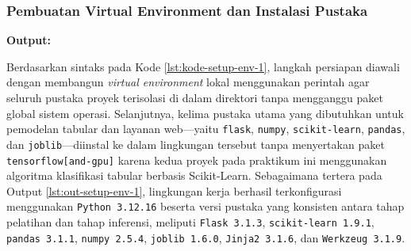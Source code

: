 \documentclass[a4paper,oneside,11pt]{book}
\begin{document}
\subsubsection{Pembuatan Virtual Environment dan Instalasi Pustaka}

\par \textbf{Output:}

\par Berdasarkan sintaks pada Kode \ref{lst:kode-setup-env-1}, langkah persiapan diawali dengan membangun \textit{virtual environment} lokal menggunakan perintah  agar seluruh pustaka proyek terisolasi di dalam direktori  tanpa mengganggu paket global sistem operasi. Selanjutnya, kelima pustaka utama yang dibutuhkan untuk pemodelan tabular dan layanan web---yaitu \texttt{flask}, \texttt{numpy}, \texttt{scikit-learn}, \texttt{pandas}, dan \texttt{joblib}---diinstal ke dalam lingkungan tersebut tanpa menyertakan paket \texttt{tensorflow[and-gpu]} karena kedua proyek pada praktikum ini menggunakan algoritma klasifikasi tabular berbasis Scikit-Learn. Sebagaimana tertera pada Output \ref{lst:out-setup-env-1}, lingkungan kerja berhasil terkonfigurasi menggunakan \texttt{Python 3.12.16} beserta versi pustaka yang konsisten antara tahap pelatihan dan tahap inferensi, meliputi \texttt{Flask 3.1.3}, \texttt{scikit-learn 1.9.1}, \texttt{pandas 3.1.1}, \texttt{numpy 2.5.4}, \texttt{joblib 1.6.0}, \texttt{Jinja2 3.1.6}, dan \texttt{Werkzeug 3.1.9}.
\end{document}
